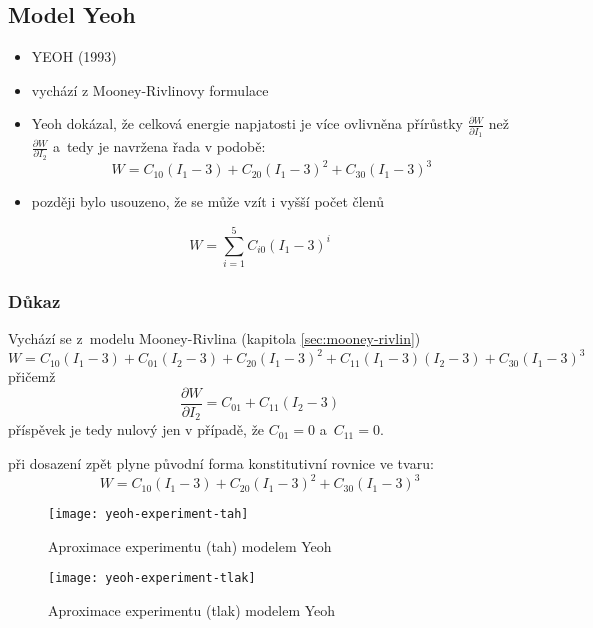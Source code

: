 
\subsection{Model Yeoh}\label{sec:yeoh}
\begin{itemize}
	\item YEOH (1993)
	\item vychází z Mooney-Rivlinovy formulace
	\item Yeoh dokázal, že celková energie napjatosti je více ovlivněna přírůstky $\frac{\partial W}{\partial I_1}$ než $\frac{\partial W}{\partial I_2}$ a~tedy je navržena řada v podobě:
	\begin{equation}
		W = C_{10} (I_1-3) + C_{20} (I_1-3)^2 + C_{30} (I_1-3)^3
	\end{equation}
	\item později bylo usouzeno, že se může vzít i vyšší počet členů
\end{itemize}
\begin{equation}
	W = \sum\limits_{i=1}^5 C_{i0} (I_1 - 3)^i
\end{equation}

\subsubsection{Důkaz}
Vychází se z~modelu Mooney-Rivlina (kapitola \ref{sec:mooney-rivlin})
\begin{equation}
	W = C_{10} (I_1-3) + C_{01} (I_2-3) + C_{20} (I_1-3)^2 + C_{11} (I_1-3) (I_2-3) + C_{30} (I_1-3)^3
\end{equation}
přičemž
\begin{equation*}
	\frac{\partial W}{\partial I_2} = C_{01} + C_{11} (I_2-3)
\end{equation*}
příspěvek je tedy nulový jen v případě, že $C_{01} = 0$ a~$C_{11} = 0$.

při dosazení zpět plyne původní forma konstitutivní rovnice ve tvaru:
\begin{equation}
	W = C_{10} (I_1-3) + C_{20} (I_1-3)^2 + C_{30} (I_1-3)^3
\end{equation}

\begin{figure}[H]
	\centering
	\texttt{[image: yeoh-experiment-tah]}
	\caption{Aproximace experimentu (tah) modelem Yeoh}
	\label{fig:yeoh-experiment-tah}
\end{figure}
\begin{figure}[H]
	\centering
	\texttt{[image: yeoh-experiment-tlak]}
	\caption{Aproximace experimentu (tlak) modelem Yeoh}
	\label{fig:yeoh-experiment-tlak}
\end{figure}